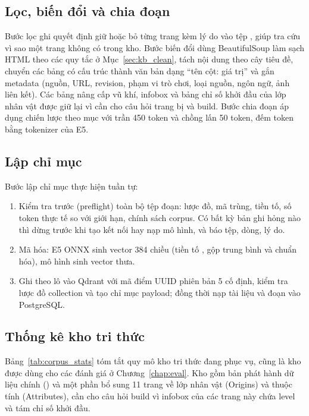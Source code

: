 \subsection{Lọc, biến đổi và chia đoạn}
\label{sec:impl_transform}

Bước lọc ghi quyết định giữ hoặc bỏ từng trang kèm lý do vào tệp , giúp tra cứu vì sao một trang không có trong kho. Bước biến đổi dùng BeautifulSoup làm sạch HTML theo các quy tắc ở Mục~\ref{sec:kb_clean}, tách nội dung theo cây tiêu đề, chuyển các bảng có cấu trúc thành văn bản dạng ``tên cột: giá trị'' và gắn metadata (nguồn, URL, revision, phạm vi trò chơi, loại nguồn, ngôn ngữ, ảnh liên kết). Các bảng nâng cấp vũ khí, infobox và bảng chỉ số khởi đầu của lớp nhân vật được giữ lại vì cần cho câu hỏi trang bị và build. Bước chia đoạn áp dụng chiến lược theo mục với trần 450 token và chồng lấn 50 token, đếm token bằng tokenizer của E5.

\subsection{Lập chỉ mục}
\label{sec:impl_index}

Bước lập chỉ mục thực hiện tuần tự:
\begin{enumerate}
    \item Kiểm tra trước (preflight) toàn bộ tệp đoạn: lược đồ, mã trùng, tiền tố, số token thực tế so với giới hạn, chính sách corpus. Có bất kỳ bản ghi hỏng nào thì dừng trước khi tạo kết nối hay nạp mô hình, và báo tệp, dòng, lý do.
    \item Mã hóa: E5 ONNX sinh vector 384 chiều (tiền tố , gộp trung bình và chuẩn hóa), mô hình  sinh vector thưa.
    \item Ghi theo lô vào Qdrant với mã điểm UUID phiên bản 5 cố định, kiểm tra lược đồ collection và tạo chỉ mục payload; đồng thời nạp tài liệu và đoạn vào PostgreSQL.
\end{enumerate}

\subsection{Thống kê kho tri thức}
\label{sec:corpus_stats}

Bảng~\ref{tab:corpus_stats} tóm tắt quy mô kho tri thức đang phục vụ, cũng là kho được dùng cho các đánh giá ở Chương~\ref{chap:eval}. Kho gồm bản phát hành dữ liệu chính () và một phần bổ sung 11 trang về lớp nhân vật (Origins) và thuộc tính (Attributes), cần cho câu hỏi build vì infobox của các trang này chứa level và tám chỉ số khởi đầu.

